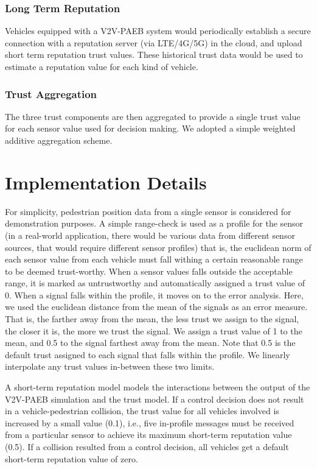 \documentclass[conference]{IEEEtran}
\begin{document}
\subsubsection{Long Term Reputation}
Vehicles equipped with a V2V-PAEB system would periodically establish a secure connection with a
reputation server (via LTE/4G/5G) in the cloud, and upload short term reputation trust values. These historical trust data would be used to estimate a reputation value for each kind of vehicle.

\subsubsection{Trust Aggregation}
The three trust components are then aggregated to provide a single trust value for each sensor value used for decision making. We adopted a simple weighted additive aggregation scheme.

\section{Implementation Details}\label{implmt}
For simplicity, pedestrian position data from a single sensor is considered for demonstration
purposes. A simple range-check is used as a profile for the sensor (in a real-world application, there would be various data from different sensor sources, that would require different sensor profiles) that is, the euclidean norm of each sensor value from each vehicle must fall withing a certain reasonable range to be deemed trust-worthy. When a sensor values falls outside the acceptable range, it is marked as untrustworthy and automatically assigned a trust value of 0. When a signal falls within the profile, it moves on to the error analysis. Here, we used the euclidean distance from the mean of the signals as an error measure. That is, the farther away from the mean, the less trust we assign to the signal, the closer it is, the more we trust the signal. We assign a trust value of 1 to the mean, and 0.5 to the signal farthest away from the mean. Note that 0.5 is the default trust assigned to each signal that falls within the profile. We linearly interpolate any trust values in-between these two limits.

A short-term reputation model models the interactions between the output of the V2V-PAEB simulation and the trust model. If a control decision does not result in a vehicle-pedestrian collision, the trust value for all vehicles involved is increased by a small value (0.1), i.e., five in-profile messages must be received from a particular sensor to achieve its maximum short-term reputation value (0.5). If a collision resulted from a control decision, all vehicles get a default short-term reputation value of zero.
\end{document}
